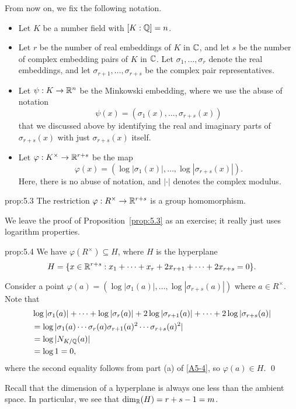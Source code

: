 From now on, we fix the following notation. 
\begin{itemize}
    \item Let $K$ be a number field with $[K : \mathbb{Q}] = n$. 
    \item Let $r$ be the number of real embeddings of $K$ in $\mathbb{C}$, and let 
    $s$ be the number of complex embedding pairs of $K$ in $\mathbb{C}$. 
    Let $\sigma_1, \dots, \sigma_r$ denote the real embeddings, and 
    let $\sigma_{r+1}, \dots, \sigma_{r+s}$ be the complex pair representatives.
    \item Let $\psi : K \to \mathbb{R}^n$ be the Minkowski embedding, where we 
    use the abuse of notation 
    \[ \psi(x) = (\sigma_1(x), \dots, \sigma_{r+s}(x)) \]
    that we discussed above by identifying the real and imaginary parts 
    of $\sigma_{r+s}(x)$ with just $\sigma_{r+s}(x)$ itself.
    \item Let $\varphi : K^\times \to \mathbb{R}^{r+s}$ be the map 
    \[ \varphi(x) = (\log|\sigma_1(x)|, \dots, \log|\sigma_{r+s}(x)|). \] 
    Here, there is no abuse of notation, and $|\cdot|$ denotes the 
    complex modulus.
\end{itemize}

\begin{prop}{prop:5.3}
    The restriction $\varphi : R^\times \to \mathbb{R}^{r+s}$ is a group homomorphism.
\end{prop}\vspace{-0.25cm}

We leave the proof of Proposition~\ref{prop:5.3} as an exercise; 
it really just uses logarithm properties.

\begin{prop}{prop:5.4}
    We have $\varphi(R^\times) \subseteq H$, where $H$ is the hyperplane 
    \[ H = \{x \in \mathbb{R}^{r+s} : x_1 + \cdots + x_r + 2x_{r+1} + \cdots + 2x_{r+s} = 0\}. \] 
\end{prop}\vspace{-0.25cm}
\begin{pf}
    Consider a point $\varphi(a) = (\log|\sigma_1(a)|, \dots, \log|\sigma_{r+s}(a)|)$
    where $a \in R^\times$. Note that 
    \begin{align*}
        &\log|\sigma_1(a)| + \cdots + \log|\sigma_r(a)| + 
        2\log|\sigma_{r+1}(a)| + \cdots + 2\log|\sigma_{r+s}(a)| \\
        &= \log|\sigma_1(a) \cdots \sigma_r(a) \sigma_{r+1}(a)^2 \cdots 
        \sigma_{r+s}(a)^2| \\ 
        &= \log |N_{K/\mathbb{Q}}(a)| \\ 
        &= \log 1 = 0, 
    \end{align*}
    where the second equality follows from part (a) of \ref{A5-4}, so 
    $\varphi(a) \in H$. \qed 
\end{pf}\vspace{-0.25cm}
Recall that the dimension of a hyperplane is always one less than the ambient 
space. In particular, we see that $\dim_{\mathbb{R}}(H) = r + s - 1 = m$. 

